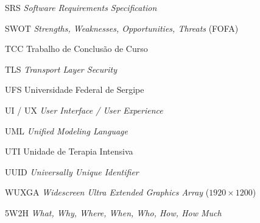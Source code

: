 \begin{siglas}
  \item[SRS] \textit{Software Requirements Specification}
  \item[SWOT] \textit{Strengths, Weaknesses, Opportunities, Threats} (FOFA)
  \item[TCC] Trabalho de Conclusão de Curso
  \item[TLS] \textit{Transport Layer Security}
  \item[UFS] Universidade Federal de Sergipe
  \item[UI / UX] \textit{User Interface / User Experience}
  \item[UML] \textit{Unified Modeling Language}
  \item[UTI] Unidade de Terapia Intensiva
  \item[UUID] \textit{Universally Unique Identifier}
  \item[WUXGA] \textit{Widescreen Ultra Extended Graphics Array} ($1920 \times 1200$)
  \item[5W2H] \textit{What, Why, Where, When, Who, How, How Much}
\end{siglas}
